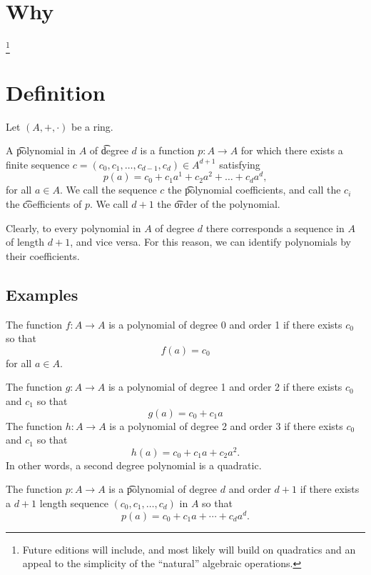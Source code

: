 
\section*{Why}

\footnote{Future editions will include, and most likely will build on quadratics and an appeal to the simplicity of the ``natural'' algebraic operations.}

\section*{Definition}

Let $(A, +, \cdot )$ be a ring.

A \t{polynomial} in $A$ of \t{degree} $d$ is a function $p: A \to A$ for which there exists a finite sequence $c = (c_0, c_1, \dots , c_{d-1}, c_d) \in A^{d+1}$ satisfying
\[
p(a) = c_0 + c_1a^1 + c_2a^2 + \dots  + c_da^d,
\]
for all $a \in A$.
We call the sequence $c$ the \t{polynomial coefficients}, and call the $c_i$ the \t{coefficients} of $p$.
We call $d+1$ the \t{order} of the polynomial.

Clearly, to every polynomial in $A$ of degree $d$ there corresponds a sequence in $A$ of length $d+1$, and vice versa.
For this reason, we can identify polynomials by their coefficients.

\subsection*{Examples}

The function $f: A \to A$ is a polynomial of degree 0 and order 1 if there exists $c_0$ so that
\[
f(a) = c_0
\]
for all $a \in A$.

The function $g: A \to A$ is a polynomial of degree 1 and order 2 if there exists $c_0$ and $c_1$ so that
\[
g(a) = c_0 + c_1a
\]
The function $h: A \to A$ is a polynomial of degree 2 and order 3 if there exists $c_0$ and $c_1$ so that
\[
h(a) = c_0 + c_1a + c_2a^2.
\]
In other words, a second degree polynomial is a quadratic.

The function $p: A \to A$ is a \t{polynomial} of degree $d$ and order $d+1$ if there exists a $d+1$ length sequence $(c_0, c_1, \dots , c_d)$ in $A$ so that
\[
p(a) = c_0 + c_1a + \cdots + c_da^d.
\]

\blankpage